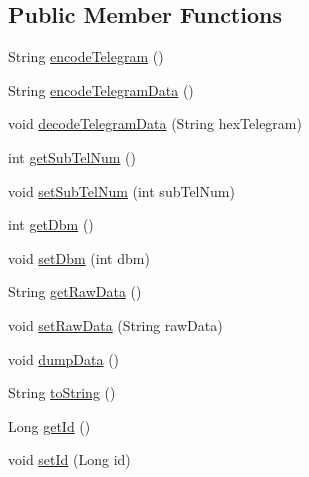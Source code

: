 \subsection*{Public Member Functions}
\begin{DoxyCompactItemize}
\item 
String \hyperlink{classch_1_1bfh_1_1gr33nopo55um_1_1enocean_1_1telegram_1_1_radio_e_r_p2_ab3af9bd9ec0c29560f3200523312f34d}{encode\+Telegram} ()
\item 
String \hyperlink{classch_1_1bfh_1_1gr33nopo55um_1_1enocean_1_1telegram_1_1_radio_e_r_p2_a23c8249da06defacc330050b493cfdc3}{encode\+Telegram\+Data} ()
\item 
void \hyperlink{classch_1_1bfh_1_1gr33nopo55um_1_1enocean_1_1telegram_1_1_radio_e_r_p2_afe767e470db5d4d4473da7696e688f48}{decode\+Telegram\+Data} (String hex\+Telegram)
\item 
int \hyperlink{classch_1_1bfh_1_1gr33nopo55um_1_1enocean_1_1telegram_1_1_radio_e_r_p2_a56aa366d3a5c468a1821d7f1695865e3}{get\+Sub\+Tel\+Num} ()
\item 
void \hyperlink{classch_1_1bfh_1_1gr33nopo55um_1_1enocean_1_1telegram_1_1_radio_e_r_p2_a8b35df2405620bd76680d3343727fdda}{set\+Sub\+Tel\+Num} (int sub\+Tel\+Num)
\item 
int \hyperlink{classch_1_1bfh_1_1gr33nopo55um_1_1enocean_1_1telegram_1_1_radio_e_r_p2_a4ada4794d8f5e61062207c15189e3917}{get\+Dbm} ()
\item 
void \hyperlink{classch_1_1bfh_1_1gr33nopo55um_1_1enocean_1_1telegram_1_1_radio_e_r_p2_ac854857018cc0635b2377a78856217d6}{set\+Dbm} (int dbm)
\item 
String \hyperlink{classch_1_1bfh_1_1gr33nopo55um_1_1enocean_1_1telegram_1_1_radio_e_r_p2_a685f21c7294670a8658dda11ae966009}{get\+Raw\+Data} ()
\item 
void \hyperlink{classch_1_1bfh_1_1gr33nopo55um_1_1enocean_1_1telegram_1_1_radio_e_r_p2_a3ad317b70888865a397fced02ea11703}{set\+Raw\+Data} (String raw\+Data)
\item 
void \hyperlink{classch_1_1bfh_1_1gr33nopo55um_1_1enocean_1_1telegram_1_1_radio_e_r_p2_a30a3c4c9017f752d521dde8bee4efb99}{dump\+Data} ()
\item 
String \hyperlink{classch_1_1bfh_1_1gr33nopo55um_1_1enocean_1_1telegram_1_1_radio_e_r_p2_ab5c597ab293469283683dc457bcea2c1}{to\+String} ()
\item 
Long \hyperlink{classch_1_1bfh_1_1gr33nopo55um_1_1enocean_1_1telegram_1_1_radio_e_r_p2_a3061b5400e16856a535752e4d17cc524}{get\+Id} ()
\item 
void \hyperlink{classch_1_1bfh_1_1gr33nopo55um_1_1enocean_1_1telegram_1_1_radio_e_r_p2_ad3a046819e84f64e46edee4f4e7584d3}{set\+Id} (Long id)
\end{DoxyCompactItemize}


